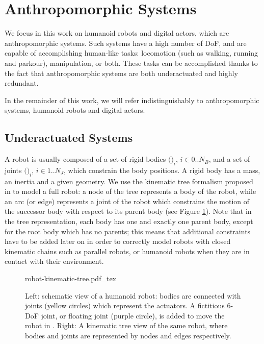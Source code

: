 \section{Anthropomorphic Systems}
\label{sec:chap1-anthropomorphic-systems}

We focus in this work on humanoid robots and digital actors, which are
anthropomorphic systems. Such systems have a high number of DoF, and
are capable of accomplishing human-like tasks: locomotion (such as
walking, running and parkour), manipulation, or both. These tasks can
be accomplished thanks to the fact that anthropomorphic systems are
both underactuated and highly redundant.

In the remainder of this work, we will refer indistinguishably to
anthropomorphic systems, humanoid robots and digital actors.

\subsection{Underactuated Systems}
\label{subsec:chap1-underactuated-systems}

A robot {\robot} is usually composed of a set of rigid bodies
$($$)_i$, $i \in 0..N_B$, and a set of joints
$($$)_i$, $i \in 1..N_J$, which constrain the body
positions. A rigid body has a mass, an inertia and a given
geometry. We use the kinematic tree formalism proposed in
\cite{feat08} to model a full robot: a node of the tree represents a
body of the robot, while an arc (or edge) represents a joint 
of the robot which constrains the motion of the successor body
 with respect to its parent body  (see
Figure \ref{fig:chap1-robot-kinematic-tree}). Note that in the tree
representation, each body has one and exactly one parent body, except
for the root body which has no parents; this means that additional
constraints have to be added later on in order to correctly model
robots with closed kinematic chains such as parallel robots, or
humanoid robots when they are in contact with their environment.

\begin{figure}
  \centering
      {\def\svgwidth{0.8\linewidth}
        
                   {robot-kinematic-tree.pdf_tex}}
      \caption[Humanoid robot kinematic tree.]{Left: schematic view of
        a humanoid robot: bodies are connected with joints (yellow
        circles) which represent the actuators. A fictitious 6-DoF
        joint, or floating joint (purple circle), is added to move the
        robot in {\segroup}. Right: A kinematic tree view of the same
        robot, where bodies and joints are represented by nodes and
        edges respectively.}
      \label{fig:chap1-robot-kinematic-tree}
\end{figure}

